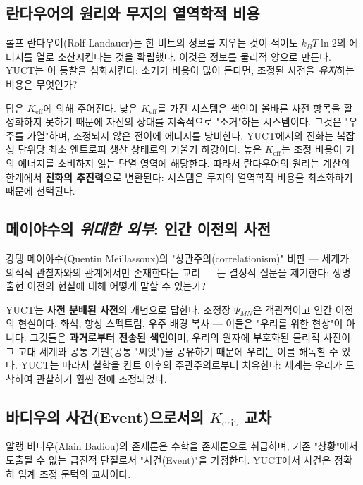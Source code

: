 \documentclass[12pt,a4paper]{article}
\newcommand{\Keff}{K_{\mathrm{eff}}}
\begin{document}
	\subsection{란다우어의 원리와 무지의 열역학적 비용}
	
	롤프 란다우어(Rolf Landauer)는 한 비트의 정보를 지우는 것이 적어도 \(k_B T \ln 2\)의 에너지를 열로 소산시킨다는 것을 확립했다. 이것은 정보를 물리적 양으로 만든다. YUCT는 이 통찰을 심화시킨다: 소거가 비용이 많이 든다면, 조정된 사전을 \emph{유지}하는 비용은 무엇인가?
	
	답은 \(\Keff\)에 의해 주어진다. 낮은 \(\Keff\)를 가진 시스템은 색인이 올바른 사전 항목을 활성화하지 못하기 때문에 자신의 상태를 지속적으로 "소거"하는 시스템이다. 그것은 "우주를 가열"하며, 조정되지 않은 전이에 에너지를 낭비한다. YUCT에서의 진화는 복잡성 단위당 최소 엔트로피 생산 상태로의 기울기 하강이다. 높은 \(\Keff\)는 조정 비용이 거의 에너지를 소비하지 않는 단열 영역에 해당한다. 따라서 란다우어의 원리는 계산의 한계에서 \textbf{진화의 추진력}으로 변환된다: 시스템은 무지의 열역학적 비용을 최소화하기 때문에 선택된다.
	
	\subsection{메이야수의 \emph{위대한 외부}: 인간 이전의 사전}
	
	캉탱 메이야수(Quentin Meillassoux)의 "상관주의(correlationism)" 비판 — 세계가 의식적 관찰자와의 관계에서만 존재한다는 교리 — 는 결정적 질문을 제기한다: 생명 출현 이전의 현실에 대해 어떻게 말할 수 있는가?
	
	YUCT는 \textbf{사전 분배된 사전}의 개념으로 답한다. 조정장 \(\Psi_{MN}\)은 객관적이고 인간 이전의 현실이다. 화석, 항성 스펙트럼, 우주 배경 복사 — 이들은 "우리를 위한 현상"이 아니다. 그것들은 \textbf{과거로부터 전송된 색인}이며, 우리의 원자에 부호화된 물리적 사전이 그 고대 세계와 공통 기원(공통 "씨앗")을 공유하기 때문에 우리는 이를 해독할 수 있다. YUCT는 따라서 철학을 칸트 이후의 주관주의로부터 치유한다: 세계는 우리가 도착하여 관찰하기 훨씬 전에 조정되었다.
	
	\subsection{바디우의 사건(Event)으로서의 \(K_{\mathrm{crit}}\) 교차}
	
	알랭 바디우(Alain Badiou)의 존재론은 수학을 존재론으로 취급하며, 기존 "상황"에서 도출될 수 없는 급진적 단절로서 "사건(Event)"을 가정한다. YUCT에서 사건은 정확히 임계 조정 문턱의 교차이다.
	
\end{document}
